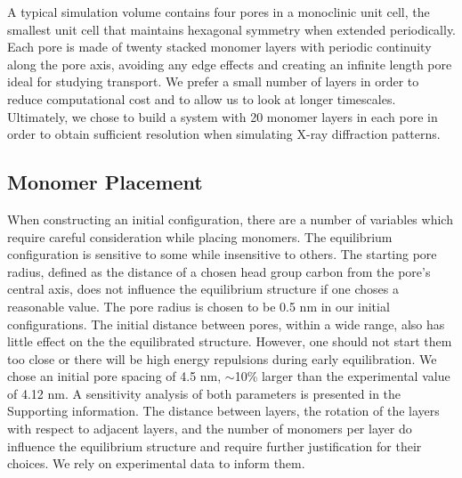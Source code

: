 \documentclass[journal=jpcbfk,manusciprt=article]{achemso}
\begin{document}
  A typical simulation volume contains four pores in a monoclinic unit cell,
  the smallest unit cell that maintains hexagonal symmetry when extended
  periodically. Each pore is made of twenty stacked monomer layers with periodic
  continuity along the pore axis, avoiding any edge effects and creating an
  infinite length pore ideal for studying transport. We prefer a small number of layers
  in order to reduce computational cost and to allow us to look at
  longer timescales. Ultimately, we chose to build a system with 20 monomer
  layers in each pore in order to obtain sufficient resolution when simulating
  X-ray diffraction patterns. %

\subsection{Monomer Placement} 

  When constructing an initial configuration, there are a number of variables
  which require careful consideration while placing monomers. The equilibrium
  configuration is sensitive to some while insensitive to others. The starting
  pore radius, defined as the distance of a chosen head group carbon from the
  pore's central axis, does not influence the equilibrium structure if one choses
  a reasonable value. The pore radius is chosen to be 0.5 nm in our initial
  configurations. 
  The initial distance between pores, within a wide range, also has little effect on
  the the equilibrated structure. However, one should not start them too close or
  there will be high energy repulsions during early equilibration. We chose an
  initial pore spacing of 4.5 nm, $\sim$10\% larger than the experimental value
  of 4.12 nm.  A sensitivity analysis of both parameters is presented in
  the 
  Supporting information.  The distance between layers, the rotation of the
  layers with respect to adjacent layers, and the number of monomers per layer do
  influence the equilibrium structure and require further justification for their
  choices. We rely on experimental data to inform them. 
\end{document}
